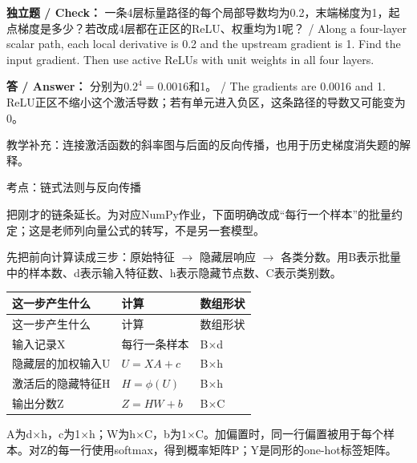 \textbf{独立题 / Check：} 一条4层标量路径的每个局部导数均为0.2，末端梯度为1，起点梯度是多少？若改成4层都在正区的ReLU、权重均为1呢？ / Along a four-layer scalar path, each local derivative is 0.2 and the upstream gradient is 1. Find the input gradient. Then use active ReLUs with unit weights in all four layers.


\textbf{答 / Answer：} 分别为\(0.2^4=0.0016\)和1。 / The gradients are 0.0016 and 1. ReLU正区不缩小这个激活导数；若有单元进入负区，这条路径的导数又可能变为0。


教学补充：连接激活函数的斜率图与后面的反向传播，也用于历史梯度消失题的解释。








考点：链式法则与反向传播
 

把刚才的链条延长。为对应NumPy作业，下面明确改成“每行一个样本”的批量约定；这是老师列向量公式的转写，不是另一套模型。


先把前向计算读成三步：原始特征 \ensuremath{\to} 隐藏层响应 \ensuremath{\to} 各类分数。用B表示批量中的样本数、d表示输入特征数、h表示隐藏节点数、C表示类别数。


\begingroup
\small\setlength{\tabcolsep}{3pt}
\renewcommand{\arraystretch}{1.22}
\begin{longtable}{@{}>{\raggedright\arraybackslash}p{}>{\raggedright\arraybackslash}p{}>{\raggedright\arraybackslash}p{}@{}}
\toprule
这一步产生什么 & 计算 & 数组形状 \\
\midrule\endfirsthead
这一步产生什么 & 计算 & 数组形状 \\
\midrule\endhead
\bottomrule\endfoot
输入记录X & 每行一条样本 & B\ensuremath{\times}d \\
隐藏层的加权输入U & \(U=XA+c\) & B\ensuremath{\times}h \\
激活后的隐藏特征H & \(H=\phi(U)\) & B\ensuremath{\times}h \\
输出分数Z & \(Z=HW+b\) & B\ensuremath{\times}C \\
\end{longtable}
\endgroup


A为d\ensuremath{\times}h，c为1\ensuremath{\times}h；W为h\ensuremath{\times}C，b为1\ensuremath{\times}C。加偏置时，同一行偏置被用于每个样本。对Z的每一行使用softmax，得到概率矩阵P；Y是同形的one-hot标签矩阵。


